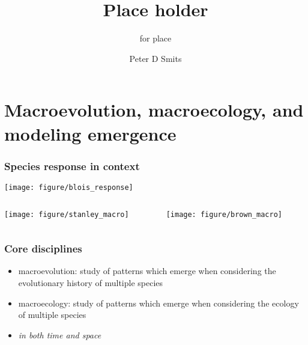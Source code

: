 \documentclass{beamer}
\title{Place holder}
\subtitle{for place}
\author{Peter D Smits}
\institute{Department of Integrative Biology, University of California -- Berkeley}
\begin{document}
\begin{frame}
  \maketitle
\end{frame}

\begin{frame}
  \tableofcontents
\end{frame}

\section{Macroevolution, macroecology, and modeling emergence}

\begin{frame}
  \frametitle{Species response in context}
  
  \begin{center}
    \texttt{[image: figure/blois\_response]}
  \end{center}
  \tiny{}
\end{frame}

\begin{frame}
  \begin{columns}
    \begin{column}{0.5\textwidth}
      \begin{center}
        \texttt{[image: figure/stanley\_macro]}
      \end{center}
    \end{column}
    \begin{column}{0.5\textwidth}
      \begin{center}
        \texttt{[image: figure/brown\_macro]}
      \end{center}
    \end{column}
  \end{columns}
\end{frame}

\begin{frame}
  \frametitle{Core disciplines}
  \begin{definition}
    \begin{itemize}
      \item \alert{macroevolution}: study of patterns which emerge when considering the evolutionary history of multiple species
      \item \alert{macroecology}: study of patterns which emerge when considering the ecology of multiple species
      \item \emph{in both time and space}
    \end{itemize}
  \end{definition}
\end{frame}
\end{document}
